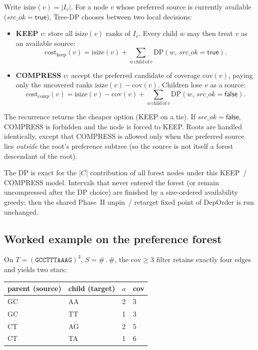 \documentclass[11pt,a4paper]{article}
\begin{document}
Write \(\mathrm{isize}(v)=|I_v|\). For a node \(v\) whose preferred
source is currently available (\(\mathit{src\_ok}=\mathsf{true}\)),
Tree-DP chooses between two local decisions:

\begin{itemize}
\item \textbf{KEEP} \(v\): store all \(\mathrm{isize}(v)\) ranks of
  \(I_v\). Every child \(w\) may then treat \(v\) as an available
  source:
  \[
  \mathrm{cost}_{\mathrm{keep}}(v)
  =
  \mathrm{isize}(v)
  +
  \sum_{w\,\mathrm{child\,of}\,v}
    \mathrm{DP}(w,\,\mathit{src\_ok}=\mathsf{true}).
  \]
\item \textbf{COMPRESS} \(v\): accept the preferred candidate of
  coverage \(\mathrm{cov}(v)\), paying only the uncovered ranks
  \(\mathrm{isize}(v)-\mathrm{cov}(v)\). Children lose \(v\) as a
  source:
  \[
  \mathrm{cost}_{\mathrm{comp}}(v)
  =
  \mathrm{isize}(v)-\mathrm{cov}(v)
  +
  \sum_{w\,\mathrm{child\,of}\,v}
    \mathrm{DP}(w,\,\mathit{src\_ok}=\mathsf{false}).
  \]
\end{itemize}
The recurrence returns the cheaper option (KEEP on a tie). If
\(\mathit{src\_ok}=\mathsf{false}\), COMPRESS is forbidden and the
node is forced to KEEP. Roots are handled identically, except that
COMPRESS is allowed only when the preferred source lies
\emph{outside} the root's preference subtree (so the source is not
itself a forest descendant of the root).

The DP is exact for the \(|C|\) contribution of all forest nodes under
this KEEP~/ COMPRESS model. Intervals that never entered the forest
(or remain uncompressed after the DP choice) are finished by a
size-ordered availability greedy; then the shared Phase~II
unpin~/ retarget fixed point of DepOrder is run unchanged.

\subsection{Worked example on the preference forest}

On \(T=(\mathtt{GCCTTTAAAG})^3\), \(S=\mathtt{\#\,.\,\#}\), the
\(\mathrm{cov}\ge 3\) filter retains exactly four edges and yields two
stars:

\begin{center}
\begin{tabular}{@{}llll@{}}
\toprule
parent (source) & child (target) & \(a\) & cov \\
\midrule
GC & AA & 2 & 3 \\
GC & TT & 1 & 3 \\
CT & AG & 2 & 5 \\
CT & TA & 1 & 6 \\
\bottomrule
\end{tabular}
\end{center}
\end{document}
